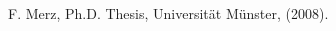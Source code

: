 \documentclass[11pt]{article}
\begin{document}
\begin{titlepage}



























\end{titlepage}

\setcounter{page}{2}

\begin{thebibliography}{99}

 F. Merz, Ph.D. Thesis, Universit\"at M\"unster, (2008).


\end{thebibliography}



\end{document}
